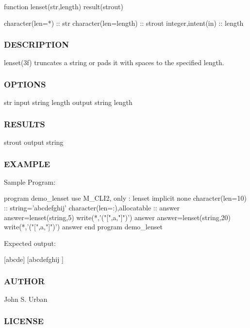 \begin{DoxyVerb}function lenset(str,length) result(strout)

 character(len=*)                     :: str
 character(len=length)                :: strout
 integer,intent(in)                   :: length
\end{DoxyVerb}
 \subsubsection*{D\+E\+S\+C\+R\+I\+P\+T\+I\+ON}

lenset(3f) truncates a string or pads it with spaces to the specified length. \subsubsection*{O\+P\+T\+I\+O\+NS}

str input string length output string length \subsubsection*{R\+E\+S\+U\+L\+TS}

strout output string \subsubsection*{E\+X\+A\+M\+P\+LE}

Sample Program\+: \begin{DoxyVerb}program demo_lenset
 use M_CLI2, only : lenset
 implicit none
 character(len=10)            :: string='abcdefghij'
 character(len=:),allocatable :: answer
    answer=lenset(string,5)
    write(*,'("[",a,"]")') answer
    answer=lenset(string,20)
    write(*,'("[",a,"]")') answer
end program demo_lenset
\end{DoxyVerb}


Expected output\+:

\mbox{[}abcde\mbox{]} \mbox{[}abcdefghij \mbox{]}

\subsubsection*{A\+U\+T\+H\+OR}

John S. Urban \subsubsection*{L\+I\+C\+E\+N\+SE}

